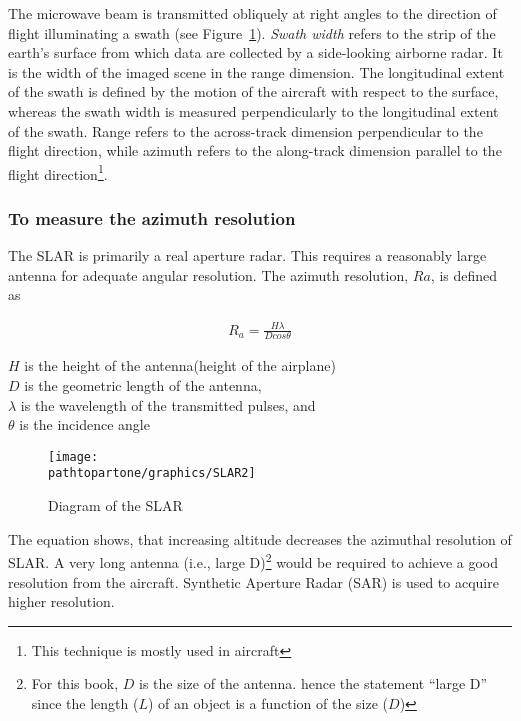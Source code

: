 The microwave beam is transmitted obliquely at right angles to the direction of flight illuminating a swath (see Figure~\ref{fig:slar2}). \textit{Swath width} refers to the strip of the earth's surface from which data are collected by a side-looking airborne radar. It is the width of the imaged scene in the range dimension. The longitudinal extent of the swath is defined by the motion of the aircraft with respect to the surface, whereas the swath width is measured perpendicularly to the longitudinal extent of the swath. Range refers to the across-track dimension perpendicular to the flight direction, while azimuth refers to the along-track dimension parallel to the flight direction\footnote{This technique is mostly used in aircraft}.

\subsubsection{To measure the azimuth resolution}
The SLAR is primarily a real aperture radar. This requires a reasonably large antenna for adequate angular resolution. The azimuth resolution, $ Ra $, is defined as


\begin{align}
R_{a}=\frac{H \lambda}{D cos\theta}
\end{align}

$ H $ is the height of the antenna(height of the airplane)\\
$ D $ is the geometric length of the antenna,\\
$\lambda$ is the wavelength of the transmitted pulses, and\\
$\theta$ is the incidence angle

\begin{figure}[h]
\centering
\texttt{[image: \\pathtopartone/graphics/SLAR2]}
\caption{Diagram of the SLAR}
\label{fig:slar2}
\end{figure}

The equation shows, that increasing altitude decreases the azimuthal resolution of SLAR. A very long antenna (i.e., large D)\footnote{For this book, $D$ is the size of the antenna. hence the statement \textquotedblleft large D\textquotedblright\; since the length ($L$) of an object is a function of the size ($D$)} would be required to achieve a good resolution from the aircraft. Synthetic Aperture Radar (SAR) is used to acquire higher resolution.

